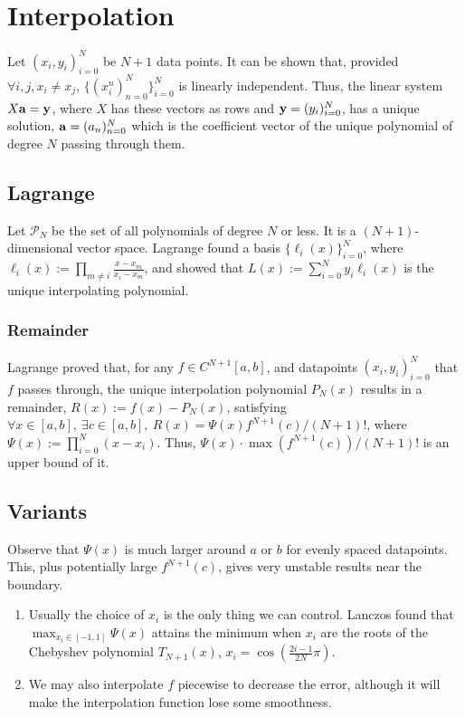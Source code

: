 \documentclass[a4paper,twocolumn,enumboxcolor=cyan!50,10pt]{onepgnote}
\begin{document}
\section{Interpolation}
Let $(x_i, y_i)_{i=0}^{N}$ be $N+1$ data points. It can be shown that, provided
$\forall i,j, x_i \ne x_j$, $\{(x_i^n)_{n=0}^N\}_{i=0}^{N}$ is linearly
independent. Thus, the linear system $X\vb{a} = \vb{y}$, where $X$ has these
vectors as rows and $\vb{y} = (y_i)_{i=0}^N$, has a unique solution, $\vb{a} =
(a_n)_{n=0}^N$ which is the coefficient vector of the unique polynomial of
degree $N$ passing through them.

\subsection{Lagrange} Let $\mathcal{P}_N$ be the set of all polynomials of
degree $N$ or less. It is a $(N+1)$-dimensional vector space.  Lagrange found a basis
$\{\ell_i(x)\}_{i=0}^N$, where $\ell_i(x) := \prod_{m \ne
i}\frac{x-x_m}{x_i-x_m}$, and showed that $L(x) := \sum_{i=0}^Ny_i\ell_i(x)$ is
the unique interpolating polynomial.

\subsubsection{Remainder} Lagrange proved that, for any $f \in C^{N+1}[a,b]$,
and datapoints $(x_i, y_i)_{i=0}^N$ that $f$ passes through, the unique
interpolation polynomial $P_N(x)$ results in a remainder, $R(x) := f(x) -
P_N(x)$, satisfying $\forall x \in [a,b],\ \exists c \in [a,b],\ R(x) =
\Psi(x)f^{N+1}(c)/\allowbreak (N+1)!$, where $\Psi(x) := \prod_{i=0}^N(x-x_i)$.
\mynote Thus, $\Psi(x) \cdot\allowbreak \max(f^{N+1}(c))/\allowbreak (N+1)!$ is an upper bound of
it.

\subsection{Variants} Observe that $\Psi(x)$ is much larger around $a$ or $b$
for evenly spaced datapoints. This, plus potentially large $f^{N+1}(c)$, gives
very unstable results near the boundary. 
\begin{enumerate}
\item
Usually the choice of $x_i$ is the only thing we can control. Lanczos found that
$\max_{x_i \in [-1,1]}\Psi(x)$ attains the minimum when $x_i$ are the roots of
the Chebyshev polynomial $T_{N+1}(x)$, $x_i = \cos(\frac{2i-1}{2N}\pi)$.
\item 
We may also interpolate $f$ piecewise to decrease the error, although it will
make the interpolation function lose some smoothness.
\end{enumerate}
\end{document}
